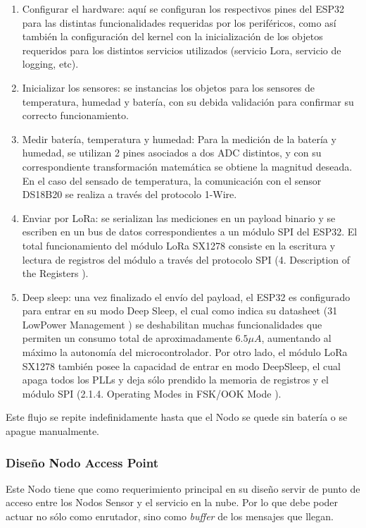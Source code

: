 \begin{enumerate}
    \item Configurar el hardware: aquí se configuran los respectivos pines del ESP32 para las distintas funcionalidades requeridas por los periféricos, como así también la configuración del kernel con la inicialización de los objetos requeridos para los distintos servicios utilizados (servicio Lora, servicio de logging, etc).
    \item Inicializar los sensores: se instancias los objetos para los sensores de temperatura, humedad y batería, con su debida validación para confirmar su correcto funcionamiento.
    \item Medir batería, temperatura y humedad: Para la medición de la batería y humedad, se utilizan 2 pines asociados a dos ADC distintos, y con su correspondiente transformación matemática se obtiene la magnitud deseada. En el caso del sensado de temperatura, la comunicación con el sensor DS18B20 se realiza a través del protocolo 1-Wire.
    \item Enviar por LoRa: se serializan las mediciones en un payload binario y se escriben en un bus de datos correspondientes a un módulo SPI del ESP32. El total funcionamiento del módulo LoRa SX1278 consiste en la escritura y lectura de registros del módulo a través del protocolo SPI (4. Description of the Registers \cite{LoraDatasheet}).
    \item Deep sleep: una vez finalizado el envío del payload, el ESP32 es configurado para entrar en su modo Deep Sleep, el cual como indica su datasheet (31 LowPower Management \cite{Esp32Datasheet}) se deshabilitan muchas funcionalidades  que permiten un consumo total de aproximadamente $6.5 \mu A$, aumentando al máximo la autonomía del microcontrolador.
    Por otro lado, el módulo LoRa SX1278 también posee la capacidad de entrar en modo DeepSleep, el cual apaga todos los PLLs y deja sólo prendido la memoria de registros y el módulo SPI (2.1.4. Operating Modes in FSK/OOK Mode \cite{LoraDatasheet}).
\end{enumerate}

Este flujo se repite indefinidamente hasta que el Nodo se quede sin batería o se apague manualmente.

\subsubsection{Diseño Nodo Access Point}

Este Nodo tiene que como requerimiento principal en su diseño servir de punto de acceso entre los Nodos Sensor y el servicio en la nube. Por lo que debe poder actuar no sólo como enrutador, sino como \textit{buffer} de los mensajes que llegan.


